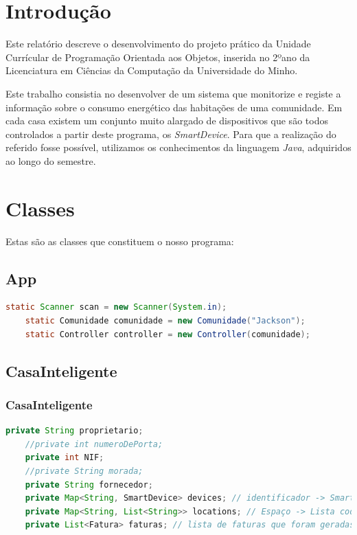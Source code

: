 \documentclass[11pt,a4paper]{report}
\begin{document}
	\tableofcontents
	
	\pagebreak
	
	\chapter{Introdução}
%	
	Este relatório descreve o desenvolvimento do projeto prático da Unidade Currícular de Programação Orientada aos Objetos, inserida no 2ºano da Licenciatura em Ciências da Computação da Universidade do Minho.
	
	Este trabalho consistia no desenvolver de um sistema que monitorize e registe a informação sobre o consumo
energético das habitações de uma comunidade. Em cada casa existem um conjunto muito alargado de dispositivos que são todos controlados a partir deste programa, os \textit{SmartDevice}. Para que a realização do referido fosse possível, utilizamos os conhecimentos da linguagem \textit{Java}, adquiridos ao longo do semestre.  
	
	\pagebreak
	\chapter{Classes}
	
	Estas são as classes que constituem o nosso programa:
	
    \section{App}
    \begin{lstlisting}[language=java,firstnumber=1]
    static Scanner scan = new Scanner(System.in);
    static Comunidade comunidade = new Comunidade("Jackson");
    static Controller controller = new Controller(comunidade);
    \end{lstlisting}
    
	\section{CasaInteligente}
	\subsection{CasaInteligente}
	\begin{lstlisting}[language=java,firstnumber=1]
    private String proprietario;
    //private int numeroDePorta;
    private int NIF;
    //private String morada;
    private String fornecedor;
    private Map<String, SmartDevice> devices; // identificador -> SmartDevice
    private Map<String, List<String>> locations; // Espaço -> Lista codigo dos devices
    private List<Fatura> faturas; // lista de faturas que foram geradas e associadas à casa
    \end{lstlisting}
    
\end{document}

